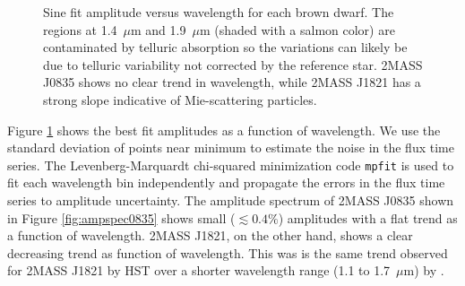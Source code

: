 \documentclass[twocolumn]{aastex6}
\begin{document}
\begin{figure}[!]
\centering
{}
	\caption{Sine fit amplitude versus wavelength for each brown dwarf. The regions at 1.4~$\mu$m and 1.9~$\mu$m (shaded with a salmon color) are contaminated by telluric absorption so the variations can likely be due to telluric variability not corrected by the reference star. 2MASS J0835 shows no clear trend in wavelength, while 2MASS J1821 has a strong slope indicative of Mie-scattering particles.}
	\label{fig:ampSpec}
\end{figure} 

Figure \ref{fig:ampSpec} shows the best fit amplitudes as a function of wavelength.
We use the standard deviation of points near minimum to estimate the noise in the flux time series.
The Levenberg-Marquardt chi-squared minimization code \texttt{mpfit} is used to fit each wavelength bin independently and propagate the errors in the flux time series to amplitude uncertainty.
The amplitude spectrum of 2MASS J0835 shown in Figure \ref{fig:ampspec0835} shows small ($\lesssim 0.4\%$) amplitudes with a flat trend as a function of wavelength.
2MASS J1821, on the other hand, shows a clear decreasing trend as function of wavelength.
This was is the same trend observed for 2MASS J1821 by HST over a shorter wavelength range (1.1 to 1.7~$\mu$m) by \citet{yang2016exStormsBD}.
\end{document}
